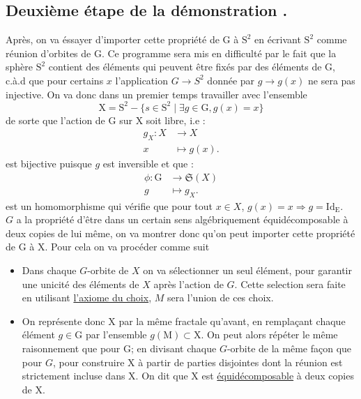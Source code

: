\subsection{Deuxième étape de la démonstration .}\label{2.}
Après, on va éssayer d'importer cette propriété de $\mathrm{G}$ à $\mathrm{S}^2$ en écrivant $\mathrm{S}^2$ comme réunion d'orbites de $\mathrm{G}$. Ce programme sera mis en difficulté par le fait que la sphère $\mathrm{S}^2$ contient des éléments qui peuvent être fixés par des éléments de $\mathrm{G}$, c.à.d que pour certains $x$ l'application $G \rightarrow S^2$ donnée par $g \rightarrow g(x)$ ne sera pas injective.
  On va donc dans un premier temps travailler avec l'ensemble $$\mathrm{X} = \mathrm{S}^2 - \{s \in \mathrm{S}^2 \mid \exists g \in \mathrm{G}, g(x) = x\}$$ de sorte que l'action de $\mathrm{G}$ sur $\mathrm{X}$ soit libre, i.e :
  \begin{align*}
 g_X \colon X &\to X\\
 x &\mapsto g(x).
\end{align*}
est bijective puisque $g$ est inversible et que :
  \begin{align*}
  \phi \colon \mathrm{G} &\to \mathfrak{S}(X)\\
  g &\mapsto g_X.
\end{align*}
est un homomorphisme qui vérifie que pour tout $x\in X$, $g(x) = x \Rightarrow g = \mathrm{Id_E}$.\\
$G$ a la propriété d'être dans un certain sens algébriquement équidécomposable à deux copies de lui même, on va montrer donc qu'on peut importer cette propriété de $\mathrm{G}$ à $\mathrm{X}$. Pour cela on va procéder comme suit
\begin{itemize}
  \item Dans chaque $G$-orbite de $X$ on va sélectionner un seul élément, pour garantir une unicité des éléments de $X$ après l'action de $G$. Cette selection sera faite en utilisant \hyperref[axiome]{l'axiome du choix}, $M$ sera l'union de ces choix.
  \item On représente donc $\mathrm{X}$ par la même fractale qu'avant, en remplaçant chaque élément $g \in \mathrm{G}$ par l'ensemble $g(\mathrm{M}) \subset \mathrm{X}$. On peut alors répéter le même raisonnement que pour $\mathrm{G}$; en divisant chaque $G$-orbite de la même façon que pour $G$, pour construire $\mathrm{X}$ à partir de parties disjointes dont la réunion est strictement incluse dans $\mathrm{X}$. On dit que $\mathrm{X}$ est \hyperref[ed]{équidécomposable} à deux copies de $\mathrm{X}$.
\end{itemize}
